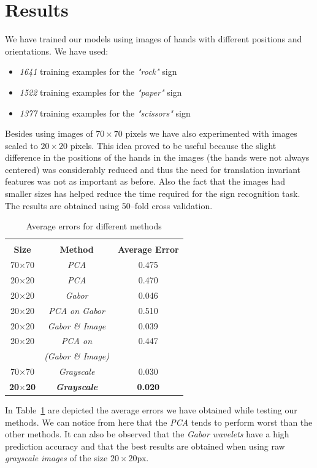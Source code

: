 \documentclass[a4paper, 11pt, twocolumn]{article}
\begin{document}
    \section{Results}
	\label{sec:results}
		We have trained our models using images of hands with different positions and orientations. We have used:
		\begin{itemize}
		\item \emph{1641} training examples for the \emph{"rock"} sign 
		\item \emph{1522} training examples for the \emph{"paper"} sign
		\item \emph{1377} training examples for the \emph{"scissors"} sign
		\end{itemize}
		Besides using images of $70\times 70$ pixels we have also experimented with images scaled to $20 \times 20$ pixels. This idea proved to be useful because the slight difference in the positions of the hands in the images (the hands were not always centered) was considerably reduced and thus the need for translation invariant features was not as important as before. Also the fact that the images had smaller sizes has helped reduce the time required for the sign recognition task.\\     
		\hspace*{10px}The results are obtained using 50--fold cross validation.\\
		\begin{table}[!hbtp]
		\begin{tabular}{| c | c | c |}
			\hline\hline
			& & \\
			\textbf{Size} & \textbf{Method} & \textbf{Average Error}\\[5px] 
			\hline\hline
			  70$\times$70 & \emph{PCA} & 0.475\\
			\hline
			  20$\times$20 & \emph{PCA} & 0.470\\
			\hline
			  20$\times$20 & \emph{Gabor} & 0.046\\
			\hline
			  20$\times$20 & \emph{PCA on Gabor} & 0.510\\
			\hline
			  20$\times$20 & \emph{Gabor \& Image} & 0.039\\
		 	\hline
			  20$\times$20 & \emph{PCA on} & 0.447\\
		               & \emph {(Gabor \& Image)}  &     \\ 			
			\hline
			  70$\times$70 & \emph{Grayscale} & 0.030\\
			\hline
			  \textbf{20$\times$20} & \textbf{\emph{Grayscale}} & \textbf{0.020}\\
			\hline
		\end{tabular}
		\caption{Average errors for different methods}
		\label{tab:res}
		\end{table}
		\hspace*{10px}In Table~\ref{tab:res} are depicted the average errors we have obtained while testing our methods. We can notice from here that the \emph{PCA} tends to perform worst than the other methods. It can also be observed that the \emph{Gabor wavelets} have a high prediction accuracy and that the best results are obtained when using raw \emph{grayscale images} of the size \emph{$20\times20$}px.  
\end{document}
